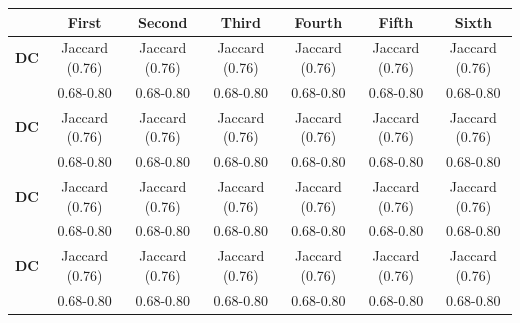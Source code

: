 \documentclass[twocolumn]{article}
\begin{document}
\begin{appendices}
	\begin{center}
			\begin{tabular}{ c c c c c c c }
				 & First & Second & Third & Fourth & Fifth & Sixth \\
				\hline
				\textbf{DC} & Jaccard (0.76) & Jaccard (0.76) & Jaccard (0.76) & Jaccard (0.76) & Jaccard (0.76) & Jaccard (0.76) \\
				& 0.68-0.80 & 0.68-0.80 & 0.68-0.80 & 0.68-0.80 & 0.68-0.80 & 0.68-0.80 \\
				\textbf{DC} & Jaccard (0.76) & Jaccard (0.76) & Jaccard (0.76) & Jaccard (0.76) & Jaccard (0.76) & Jaccard (0.76) \\
				& 0.68-0.80 & 0.68-0.80 & 0.68-0.80 & 0.68-0.80 & 0.68-0.80 & 0.68-0.80 \\
				\textbf{DC} & Jaccard (0.76) & Jaccard (0.76) & Jaccard (0.76) & Jaccard (0.76) & Jaccard (0.76) & Jaccard (0.76) \\
				& 0.68-0.80 & 0.68-0.80 & 0.68-0.80 & 0.68-0.80 & 0.68-0.80 & 0.68-0.80 \\
				\textbf{DC} & Jaccard (0.76) & Jaccard (0.76) & Jaccard (0.76) & Jaccard (0.76) & Jaccard (0.76) & Jaccard (0.76) \\
				& 0.68-0.80 & 0.68-0.80 & 0.68-0.80 & 0.68-0.80 & 0.68-0.80 & 0.68-0.80 \\
			\end{tabular}
	\end{center}

\end{appendices}
\end{document}
